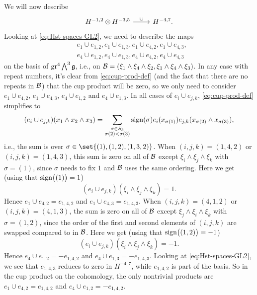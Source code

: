 We will now describe
\[
  \begin{tikzcd}
    H^{-1,2} \otimes H^{-3,5} \ar[r,"\cup"] & H^{-4,7}.
  \end{tikzcd}
\]
Looking at \eqref{eq:Hst-spaces-GL2}, we need to describe the maps
\begin{align*}
  &e_{1} \cup e_{1,2}, e_{1} \cup e_{1,3}, e_{1} \cup e_{4,2}, e_{1} \cup e_{4,3}, \\
  &e_{4} \cup e_{1,2}, e_{4} \cup e_{1,3}, e_{4} \cup e_{4,2}, e_{4} \cup e_{4,3}
\end{align*}
on the basis of $\operatorname{gr}^{4} \bigwedge^{3}\mathfrak{g}$, i.e., on $\mathcal{B} = (\xi_{1} \wedge \xi_{4} \wedge \xi_{2}, \xi_{1} \wedge \xi_{4} \wedge \xi_{3})$. In any case with repeat numbers, it's clear from \eqref{eq:cup-prod-def} (and the fact that there are no repeats in $\mathcal{B}$) that the cup product will be zero, so we only need to consider $e_{1} \cup e_{4,2}$, $e_{1} \cup e_{4,3}$, $e_{4} \cup e_{1,2}$ and $e_{4} \cup e_{1,3}$. In all cases of $e_{i} \cup e_{j,k}$, \eqref{eq:cup-prod-def} simplifies to
\begin{equation*}
  (e_{i} \cup e_{j,k})(x_{1} \wedge x_{2} \wedge x_{3}) = \sum_{\substack{\sigma \in S_{3} \\ \sigma(2) < \sigma(3)}} \operatorname{sign}(\sigma) e_{i}(x_{\sigma(1)}) e_{j,k}(x_{\sigma(2)} \wedge x_{\sigma(3)}),
\end{equation*}
i.e., the sum is over $\sigma \in \set{(1), (1,2), (1,3,2)}$. When $(i,j,k) = (1,4,2)$ or $(i,j,k) = (1,4,3)$, this sum is zero on all of $\mathcal{B}$ except $\xi_{i} \wedge \xi_{j} \wedge \xi_{k}$ with $\sigma=(1)$, since $\sigma$ needs to fix $1$ and $\mathcal{B}$ uses the same ordering. Here we get (using that $\operatorname{sign}\bigl((1)\bigr) = 1$)
\begin{equation*}
  (e_{i} \cup e_{j,k})(\xi_{i} \wedge \xi_{j} \wedge \xi_{k}) = 1.
\end{equation*}
Hence $e_{1} \cup e_{4,2} = e_{1,4,2}$ and $e_{1} \cup e_{4,3} = e_{1,4,3}$. When $(i,j,k) = (4,1,2)$ or $(i,j,k) = (4,1,3)$, the sum is zero on all of $\mathcal{B}$ except $\xi_{j} \wedge \xi_{i} \wedge \xi_{k}$ with $\sigma=(1,2)$, since the order of the first and second elements of $(i,j,k)$ are swapped compared to in $\mathcal{B}$. Here we get (using that $\operatorname{sign}\bigl((1,2)\bigr) = -1$)
\begin{equation*}
  (e_{i} \cup e_{j,k})(\xi_{i} \wedge \xi_{j} \wedge \xi_{k}) = -1.
\end{equation*}
Hence $e_{4} \cup e_{1,2} = -e_{1,4,2}$ and $e_{4} \cup e_{1,3} = -e_{1,4,3}$. Looking at \eqref{eq:Hst-spaces-GL2}, we see that $e_{1,4,3}$ reduces to zero in $H^{-4,7}$, while $e_{1,4,2}$ is part of the basis. So in the cup product on the cohomology, the only nontrivial products are $e_{1} \cup e_{4,2} = e_{1,4,2}$ and $e_{4} \cup e_{1,2} = -e_{1,4,2}$.

